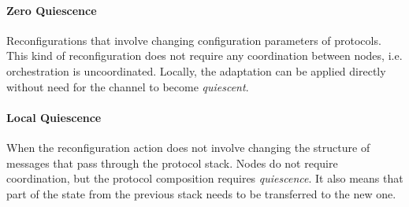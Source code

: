 \paragraph{Zero Quiescence} Reconfigurations that involve changing configuration parameters of protocols. This kind of reconfiguration does not require any coordination between nodes, i.e. orchestration is uncoordinated. Locally, the adaptation can be applied directly without need for the channel to become \textit{quiescent}.
\paragraph{Local Quiescence} When the reconfiguration action does not involve changing the structure of messages that pass through the protocol stack. Nodes do not require coordination, but the protocol composition requires \textit{quiescence}. It also means that part of the state from the previous stack needs to be transferred to the new one.
